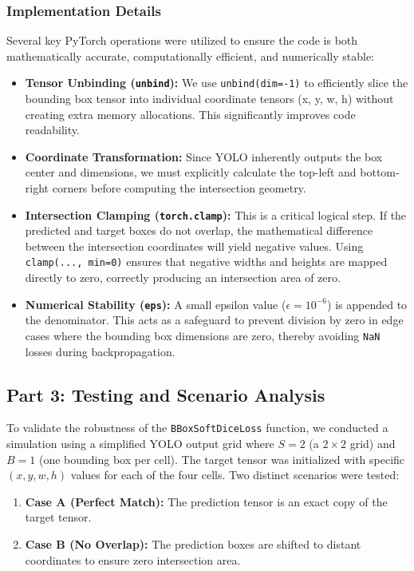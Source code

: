 \documentclass{article}
\begin{document}
\subsubsection*{Implementation Details}
Several key PyTorch operations were utilized to ensure the code is both mathematically accurate, computationally efficient, and numerically stable:
\begin{itemize}
	\item \textbf{Tensor Unbinding (\texttt{unbind}):} We use \texttt{unbind(dim=-1)} to efficiently slice the bounding box tensor into individual coordinate tensors (x, y, w, h) without creating extra memory allocations. This significantly improves code readability.
	\item \textbf{Coordinate Transformation:} Since YOLO inherently outputs the box center and dimensions, we must explicitly calculate the top-left and bottom-right corners before computing the intersection geometry.
	\item \textbf{Intersection Clamping (\texttt{torch.clamp}):} This is a critical logical step. If the predicted and target boxes do not overlap, the mathematical difference between the intersection coordinates will yield negative values. Using \texttt{clamp(..., min=0)} ensures that negative widths and heights are mapped directly to zero, correctly producing an intersection area of zero.
	\item \textbf{Numerical Stability (\texttt{eps}):} A small epsilon value ($\epsilon = 10^{-6}$) is appended to the denominator. This acts as a safeguard to prevent division by zero in edge cases where the bounding box dimensions are zero, thereby avoiding \texttt{NaN} losses during backpropagation.
\end{itemize}

\subsection{Part 3: Testing and Scenario Analysis}

To validate the robustness of the \texttt{BBoxSoftDiceLoss} function, we conducted a simulation using a simplified YOLO output grid where $S=2$ (a $2 \times 2$ grid) and $B=1$ (one bounding box per cell). The target tensor was initialized with specific $(x, y, w, h)$ values for each of the four cells. Two distinct scenarios were tested:

\begin{enumerate}
	\item \textbf{Case A (Perfect Match):} The prediction tensor is an exact copy of the target tensor.
	\item \textbf{Case B (No Overlap):} The prediction boxes are shifted to distant coordinates to ensure zero intersection area.
\end{enumerate}
\end{document}

